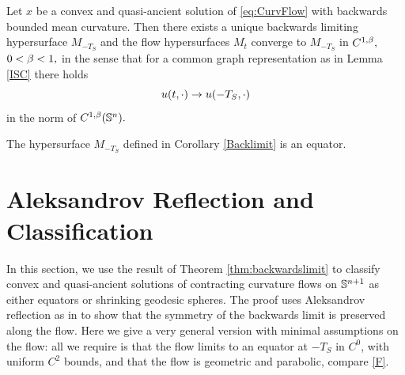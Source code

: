 \documentclass{amsart}
\begin{document}
\begin{cor}\label{Backlimit}
Let $x$ be a convex and quasi-ancient solution of \eqref{eq:CurvFlow} with backwards bounded mean curvature. Then there exists a unique backwards limiting hypersurface $M_{-T_S}$ and the flow hypersurfaces $M_t$ converge to $M_{-T_S}$ in $C^{1,\b},$ $0<\b<1,$ in the sense that for a common graph representation as in Lemma \ref{ISC} there holds
$$u(t,\cdot)\ra u(-T_S,\cdot)$$
in the norm of $C^{1,\b}(\S^n).$
\end{cor}
\begin{thm}
\label{thm:backwardslimit}
The hypersurface $M_{-T_S}$ defined in Corollary \ref{Backlimit} is an equator.
\end{thm}
\section{Aleksandrov Reflection and Classification}\label{sec:reflection}
In this section, we use the result of Theorem \ref{thm:backwardslimit} to classify convex and quasi-ancient solutions of contracting curvature flows on \(\S^{n+1}\) as either equators or shrinking geodesic spheres. The proof uses Aleksandrov reflection as in \cite{BryanIvaki:08/2015, BryanLouie:04/2016} to show that the symmetry of the backwards limit is preserved along the flow. Here we give a very general version with minimal assumptions on the flow: all we require is that the flow limits to an equator at $-T_S$ in \(C^0\), with uniform \(C^2\) bounds, and that the flow is geometric and parabolic, compare \cref{F}.
\end{document}
